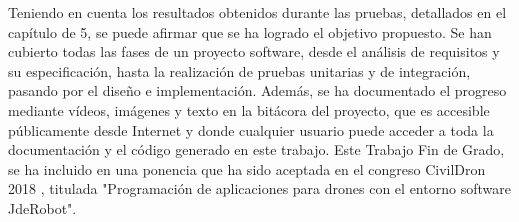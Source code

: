 Teniendo en cuenta los resultados obtenidos durante las pruebas, detallados en el capítulo de 5, se puede afirmar que se ha logrado el objetivo propuesto. Se han cubierto todas las fases de un proyecto software, desde el análisis de requisitos y su especificación, hasta la realización de pruebas unitarias y de integración, pasando por el diseño e implementación. Además, se ha documentado el progreso mediante vídeos, imágenes y texto en la bitácora del proyecto, que es accesible públicamente desde Internet y donde cualquier usuario puede acceder a toda la documentación y el código generado en este trabajo. Este Trabajo Fin de Grado, se ha incluido en una ponencia que ha sido aceptada en el congreso CivilDron 2018 \cite{civilDron}, titulada "Programación de aplicaciones para drones con el entorno software JdeRobot". 

